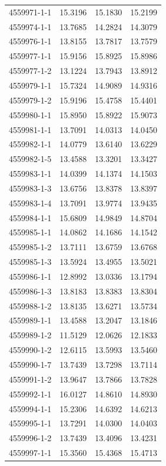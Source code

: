 \begin{longtable}{lrrr}
4559971-1-1 & 15.3196 & 15.1830 & 15.2199 \\
4559974-1-1 & 13.7685 & 14.2824 & 14.3079 \\
4559976-1-1 & 13.8155 & 13.7817 & 13.7579 \\
4559977-1-1 & 15.9156 & 15.8925 & 15.8986 \\
4559977-1-2 & 13.1224 & 13.7943 & 13.8912 \\
4559979-1-1 & 15.7324 & 14.9089 & 14.9316 \\
4559979-1-2 & 15.9196 & 15.4758 & 15.4401 \\
4559980-1-1 & 15.8950 & 15.8922 & 15.9073 \\
4559981-1-1 & 13.7091 & 14.0313 & 14.0450 \\
4559982-1-1 & 14.0779 & 13.6140 & 13.6229 \\
4559982-1-5 & 13.4588 & 13.3201 & 13.3427 \\
4559983-1-1 & 14.0399 & 14.1374 & 14.1503 \\
4559983-1-3 & 13.6756 & 13.8378 & 13.8397 \\
4559983-1-4 & 13.7091 & 13.9774 & 13.9435 \\
4559984-1-1 & 15.6809 & 14.9849 & 14.8704 \\
4559985-1-1 & 14.0862 & 14.1686 & 14.1542 \\
4559985-1-2 & 13.7111 & 13.6759 & 13.6768 \\
4559985-1-3 & 13.5924 & 13.4955 & 13.5021 \\
4559986-1-1 & 12.8992 & 13.0336 & 13.1794 \\
4559986-1-3 & 13.8183 & 13.8383 & 13.8304 \\
4559988-1-2 & 13.8135 & 13.6271 & 13.5734 \\
4559989-1-1 & 13.4588 & 13.2047 & 13.1846 \\
4559989-1-2 & 11.5129 & 12.0626 & 12.1833 \\
4559990-1-2 & 12.6115 & 13.5993 & 13.5460 \\
4559990-1-7 & 13.7439 & 13.7298 & 13.7114 \\
4559991-1-2 & 13.9647 & 13.7866 & 13.7828 \\
4559992-1-1 & 16.0127 & 14.8610 & 14.8930 \\
4559994-1-1 & 15.2306 & 14.6392 & 14.6213 \\
4559995-1-1 & 13.7291 & 14.0300 & 14.0403 \\
4559996-1-2 & 13.7439 & 13.4096 & 13.4231 \\
4559997-1-1 & 15.3560 & 15.4368 & 15.4713 \\

\end{longtable}
